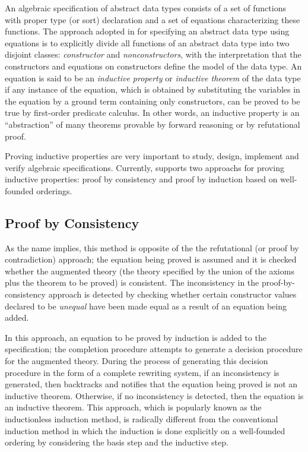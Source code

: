An algebraic specification of abstract data types consists of a set of
functions with proper type (or sort) declaration and a set of
equations characterizing these functions.  The approach adopted in
\RRL for specifying an abstract data type using equations is to
explicitly divide all functions of an abstract data type into two
disjoint classes: {\em constructor} and {\em nonconstructors}, with
the interpretation that the constructors and equations on constructors
define the model of the data type.  An equation is said to be an {\em
inductive property} or {\em inductive theorem} of the data type
if any instance of the equation, which is obtained by substituting the
variables in the equation by a ground term containing only constructors, can
be proved to be true by first-order predicate calculus.  In other
words, an inductive property is an ``abstraction'' of many theorems
provable by forward reasoning or by refutational proof.

Proving inductive properties are very important to study, design, implement and
verify algebraic specifications. Currently, \RRL supports two approachs
for proving inductive properties: proof by consistency and 
proof by induction based on well-founded orderings.

\subsection{Proof by Consistency}

As the name implies, this method is opposite of the
the refutational (or proof by contradiction) approach;
the equation being proved is assumed
and it is checked whether the augmented theory
(the theory specified by the union of
the axioms plus the theorem to be proved) is consistent.  
The inconsistency in the proof-by-consistency approach is
detected by checking whether certain constructor values
declared to be {\em unequal} have
been made equal as a result of an equation being added.

In this approach, an equation to be proved by induction is added to 
the specification; the completion procedure attempts to generate a decision
procedure for the augmented theory.  During the process of generating
this decision procedure in the form of a complete rewriting system, if
an inconsistency is generated, then \RRL backtracks and notifies that
the equation being proved is not an inductive theorem.  Otherwise, if
no inconsistency is detected, then the equation is an inductive
theorem. 
This approach, which is popularly known as the inductionless induction
method, is radically different from the conventional induction method
in which the induction is done explicitly on a well-founded ordering
by considering the basis step and the inductive step.  

